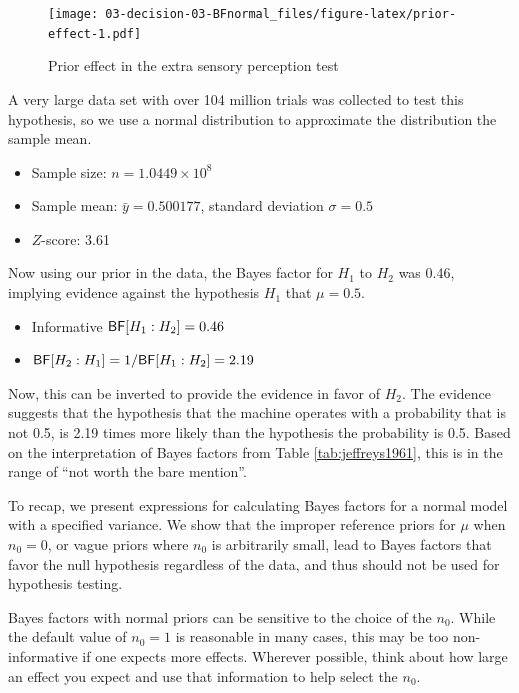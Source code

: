 \documentclass[]{book}
\providecommand{\tightlist}{%
  \setlength{\itemsep}{0pt}\setlength{\parskip}{0pt}}
\theoremstyle{definition}
\theoremstyle{definition}
\theoremstyle{definition}
\theoremstyle{remark}
\begin{document}
\begin{figure}
\centering
\texttt{[image: 03-decision-03-BFnormal\_files/figure-latex/prior-effect-1.pdf]}
\caption{\label{fig:prior-effect}Prior effect in the extra sensory
perception test}
\end{figure}

A very large data set with over 104 million trials was collected to test
this hypothesis, so we use a normal distribution to approximate the
distribution the sample mean.

\begin{itemize}
\tightlist
\item
  Sample size: \(n = 1.0449 \times 10^8\)
\item
  Sample mean: \(\bar{y} = 0.500177\), standard deviation
  \(\sigma = 0.5\)
\item
  \(Z\)-score: 3.61
\end{itemize}

Now using our prior in the data, the Bayes factor for \(H_1\) to \(H_2\)
was 0.46, implying evidence against the hypothesis \(H_1\) that
\(\mu = 0.5\).

\begin{itemize}
\tightlist
\item
  Informative \(\textsf{BF}[H_1:H_2] = 0.46\)
\item
  \(\textsf{BF}[H_2:H_1] = 1/\textsf{BF}[H_1:H_2] = 2.19\)
\end{itemize}

Now, this can be inverted to provide the evidence in favor of \(H_2\).
The evidence suggests that the hypothesis that the machine operates with
a probability that is not 0.5, is 2.19 times more likely than the
hypothesis the probability is 0.5. Based on the interpretation of Bayes
factors from Table \ref{tab:jeffreys1961}, this is in the range of ``not
worth the bare mention''.

To recap, we present expressions for calculating Bayes factors for a
normal model with a specified variance. We show that the improper
reference priors for \(\mu\) when \(n_0 = 0\), or vague priors where
\(n_0\) is arbitrarily small, lead to Bayes factors that favor the null
hypothesis regardless of the data, and thus should not be used for
hypothesis testing.

Bayes factors with normal priors can be sensitive to the choice of the
\(n_0\). While the default value of \(n_0 = 1\) is reasonable in many
cases, this may be too non-informative if one expects more effects.
Wherever possible, think about how large an effect you expect and use
that information to help select the \(n_0\).
\end{document}
